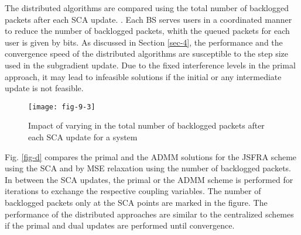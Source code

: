 The distributed algorithms are compared using the total number of backlogged packets after each \ac{SCA} update. . Each \ac{BS} serves  users in a coordinated manner to reduce the number of backlogged packets, whith the queued packets for each user is given by  bits. As discussed in Section \ref{sec-4}, the performance and the convergence speed of the distributed algorithms are susceptible to the step size used in the subgradient update. Due to the fixed interference levels in the primal approach, it may lead to infeasible solutions if the initial or any intermediate update is not feasible.
\begin{figure}
	\centering
	\texttt{[image: fig-9-3]}
	\caption{Impact of varying  in the total number of backlogged packets after each \ac{SCA} update for a system }
	\label{fig-d-3.1}
\end{figure}

Fig. \ref{fig-d} compares the primal and the \ac{ADMM} solutions for the \ac{JSFRA} scheme using the \ac{SCA} and by \ac{MSE} relaxation using the number of backlogged packets. In between the \ac{SCA} updates, the primal or the \ac{ADMM} scheme is performed for  iterations to exchange the respective coupling variables. The number of backlogged packets only at the \ac{SCA} points are marked in the figure. The performance of the distributed approaches are similar to the centralized schemes if the primal and dual updates are performed until convergence. %

